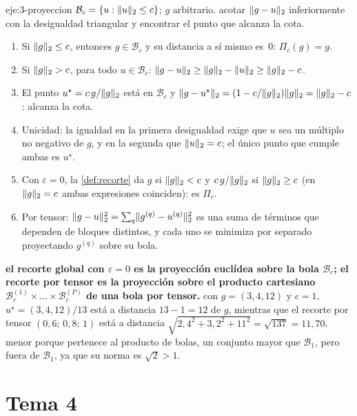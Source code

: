 \begin{solucion}{eje:3-proyeccion}
\datos $\mathcal{B}_c=\{u:\lVert u\rVert_2\le c\}$; $g$ arbitrario.
\planteamiento acotar $\lVert g-u\rVert_2$ inferiormente con la desigualdad triangular y encontrar el punto que alcanza la cota.
\pasos
\begin{enumerate}[label=\arabic*.]
  \item Si $\lVert g\rVert_2\le c$, entonces $g\in\mathcal{B}_c$ y su distancia a sí mismo es~0: $\Pi_c(g)=g$.
  \item Si $\lVert g\rVert_2>c$, para todo $u\in\mathcal{B}_c$: $\lVert g-u\rVert_2\ge\lVert g\rVert_2-\lVert u\rVert_2\ge\lVert g\rVert_2-c$.
  \item El punto $u^{\star}=c\,g/\lVert g\rVert_2$ está en $\mathcal{B}_c$ y $\lVert g-u^{\star}\rVert_2=(1-c/\lVert g\rVert_2)\lVert g\rVert_2=\lVert g\rVert_2-c$: alcanza la cota.
  \item Unicidad: la igualdad en la primera desigualdad exige que $u$ sea un múltiplo no negativo de $g$, y en la segunda que $\lVert u\rVert_2=c$; el único punto que cumple ambas es $u^{\star}$.
  \item Con $\varepsilon=0$, la \cref{def:recorte} da $g$ si $\lVert g\rVert_2<c$ y $c\,g/\lVert g\rVert_2$ si $\lVert g\rVert_2\ge c$ (en $\lVert g\rVert_2=c$ ambas expresiones coinciden): es $\Pi_c$.
  \item Por tensor: $\lVert g-u\rVert_2^{2}=\sum_q\lVert g^{(q)}-u^{(q)}\rVert_2^{2}$ es una suma de términos que dependen de bloques distintos, y cada uno se minimiza por separado proyectando $g^{(q)}$ sobre su bola.
\end{enumerate}
\resultado \textbf{el recorte global con $\varepsilon=0$ es la proyección euclídea sobre la bola $\mathcal{B}_c$; el recorte por tensor es la proyección sobre el producto cartesiano $\mathcal{B}^{(1)}_c\times\dots\times\mathcal{B}^{(P)}_c$ de una bola por tensor.}
\comprobacion con $g=(3,4,12)$ y $c=1$, $u^{\star}=(3,4,12)/13$ está a distancia $13-1=12$ de $g$, mientras que el recorte por tensor $(0{,}6;\allowbreak\,0{,}8;\allowbreak\,1)$ está a distancia $\sqrt{2{,}4^{2}+3{,}2^{2}+11^{2}}=\sqrt{137}=11{,}70$, menor porque pertenece al producto de bolas, un conjunto mayor que $\mathcal{B}_1$, pero fuera de $\mathcal{B}_1$, ya que su norma es $\sqrt 2>1$.
\end{solucion}

\section{Tema 4}


